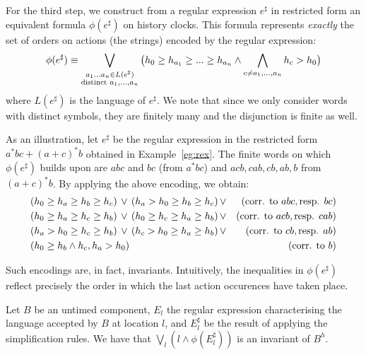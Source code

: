 \documentclass{LMCS}
\newcommand{\mycomment}[1]{}
\newcommand{\cn}{\mathit{B}\xspace}
\newcommand{\te}{h_0}
\theoremstyle{plain}\newtheorem{remark}[thm]{Remark}
\theoremstyle{plain}\newtheorem{example}[thm]{Example}
\begin{document}
For the third step, we construct from a regular expression $e^{\sharp}$ in
restricted form an equivalent formula $\phi(e^{\sharp})$ on history
clocks. This formula represents {\em exactly} the set of orders on
actions (the strings) encoded by the regular expression:
\[\phi(e^{\sharp}) \equiv \bigvee\limits_{\substack{a_1...a_n \in L(e^{\sharp})\\\textup{distinct }a_1,\dots,a_n}} \big(\te \geq h_{a_1} \geq ... \geq
h_{a_n} \wedge \bigwedge_{c\not=a_1,...,a_n} h_c > \te\big)\] where
$L(e^{\sharp})$ is the language of $e^{\sharp}$. We note that since we
only consider words with distinct symbols, they are finitely many and
the disjunction is finite as well.

As an illustration, let $e^{\sharp}$ be the regular expression in the
restricted form $a^*bc + (a+c)^*b$ obtained in
Example~\ref{eg:rex}. The finite words on which $\phi(e^{\sharp})$
builds upon are $abc$ and $bc$ (from $a^*bc$) and $acb, cab, cb, ab,
b$ from $(a+c)^*b$. By applying the above encoding, we obtain:
\begin{align*}
& (h_0 \geq h_a \geq h_b \geq h_c)\, \vee\, (h_a > h_0 \geq h_b \geq h_c)\, \vee & (\textup{corr. to }abc, \textup{resp. }bc)\\ 
& (h_0 \geq h_a \geq h_c \geq h_b)\, \vee\, (h_0 \geq h_c \geq h_a \geq h_b)\, \vee & (\textup{corr. to } acb, \textup{resp. }cab)\\
& (h_a > h_0 \geq h_c \geq h_b)\, \vee\, (h_c > h_0 \geq h_a \geq h_b)\, \vee & (\textup{corr. to }cb, \textup{resp. }ab)\\
& (h_0 \geq h_b \wedge h_c, h_a > h_0) & (\textup{corr. to }b)
\end{align*}

\noindent Such encodings are, in fact, invariants. Intuitively, the inequalities
in $\phi(e^{\sharp})$ reflect precisely the order in which the last
action occurences have taken place.

\begin{prop}
  Let $\cn$ be an untimed component, $E_l$ the regular expression
  characterising the language accepted by $\cn$ at location $l$, and
  $E_l^\sharp$ be the result of applying the simplification rules.  We
  have that $\bigvee_l (l \wedge \phi(E_l^{\sharp}))$ is an invariant
  of $\cn^h$.
\end{prop}
\mycomment{de la Marius: (existing text for equivalence $L(e)$ and
  $L(e^#)$ $\dots$ Now, for regular expressions $e^#$ in restricted
  form we can prove the following property.  For every word $w$ in
  $L(e^\sharp)$, the restricted sub-word $w_loc$ obtained from $w$ by
  removing all but last occurrences of every symbol belongs to
  $L^(e^\sharp)$ as well.  Henceforth, one can enumerate over all last
  occurrence words $w_loc$ by simply considering all accepted words of
  $L(e^\sharp)$ having distinct symbols.  $\dots$ (existing text for
  constructing the constraints $\Phi(e^\sharp))$ } 
\end{document}
